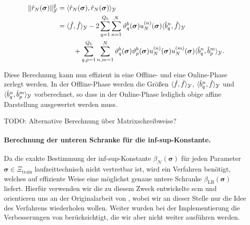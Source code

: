 \documentclass[../main.tex]{subfiles}
\begin{document}
\begin{equation}
    \begin{aligned}
        \norm{\hat{r}_{N}(\bm \sigma)}_{\mathcal Y}^{2}
        &= \skp{\hat{r}_{N}(\bm \sigma)}{\hat{r}_{N}(\bm \sigma)}{\mathcal Y}
        \\&= \begin{multlined}[t]
            \skp{\hat{f}}{\hat{f}}{\mathcal Y}
                - 2 \sum_{q = 1}^{Q_b} \sum_{n = 1}^{N} \theta_{q}^{b}(\bm \sigma) u_{N}^{(n)}(\bm \sigma) \skp{\hat{b}^{n}_{q}}{\hat{f}}{\mathcal Y}
                \\+ \sum_{q, p = 1}^{Q_b} \sum_{n, m = 1}^{N} \theta_{q}^{b}(\bm \sigma) \theta_{p}^{b}(\bm \sigma) u_{N}^{(n)}(\bm \sigma) u_{N}^{(m)}(\bm \sigma) \skp{\hat{b}^{n}_{q}}{\hat{b}^{m}_{p}}{\mathcal Y}.
        \end{multlined}
    \end{aligned}
\end{equation}

Diese Berechnung kann nun effizient in eine Offline- und eine Online-Phase zerlegt werden.
In der Offline-Phase werden die Größen $\langle\hat{f},\hat{f}\rangle_{\mathcal Y}$, $\langle\hat{b}^{n}_{q},\hat{f}\rangle_{\mathcal Y}$ und $\langle\hat{b}^{n}_{q},\hat{b}^{m}_{p}\rangle_{\mathcal Y}$ vorberechnet, so dass in der Online-Phase lediglich obige affine Darstellung ausgewertet werden muss.

TODO: Alternative Berechnung über Matrixschreibweise?


\paragraph{Berechnung der unteren Schranke für die inf-sup-Konstante.} %
\label{par:berechnung_der_unteren_schranke_f_r_die_inf_sup_konstante_}

Da die exakte Bestimmung der inf-sup-Konstante $\beta_{\mathcal N}(\bm \sigma)$ für jeden Parameter $\bm \sigma \in \Xi_{\mathrm{train}}$ laufzeittechnisch nicht vertretbar ist, wird ein Verfahren benötigt, welches auf effiziente Weise eine möglichst genaue untere Schranke $\beta_{\mathrm{LB}}(\bm \sigma)$ liefert.
Hierfür verwenden wir die zu diesem Zweck entwickelte \ac{scm} und orientieren uns an der Originalarbeit von \textcite{Huynh2007}, wobei wir an dieser Stelle nur die Idee des Verfahrens wiederholen wollen.
Weiter wurden bei der Implementierung die Verbesserungen von \textcite{Chen2009} berücksichtigt, die wir aber nicht weiter ausführen werden.
\end{document}
